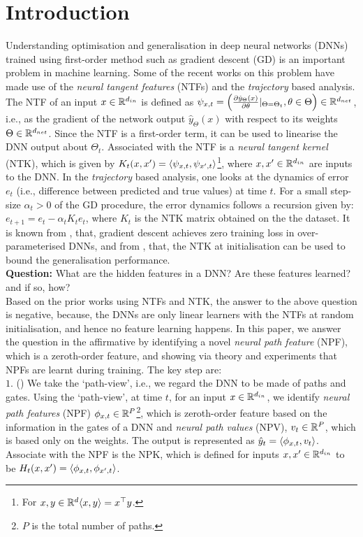 \section{Introduction}
Understanding optimisation and generalisation in deep neural networks (DNNs) trained using first-order method such as gradient descent (GD) is an important problem in machine learning. Some of the recent works on this problem have made use of the \emph{neural tangent features} (NTFs) and the \emph{trajectory} based analysis. The NTF of an input $x\in \mathbb{R}^{d_{in}}$ is defined as $\psi_{x,t}=\left(\frac{\partial \hat{y}_{\Theta}(x)}{\partial \theta}|_{\Theta=\Theta_t},\theta \in \Theta\right)\in \mathbb{R}^{d_{net}}$, i.e., as the gradient of the network output $\hat{y}_{\Theta}(x)$ with respect to its weights $\Theta\in\mathbb{R}^{d_{net}}$. Since the NTF is a first-order term, it can be used to linearise the DNN output about $\Theta_t$. Associated with the NTF is a \emph{neural tangent kernel} (NTK), which is given by $K_t(x,x')=\langle \psi_{x,t},\psi_{x',t}\rangle$\footnote{For $x,y\in\mathbb{R}^d \langle x,y\rangle=x^\top y$.}, where $x,x'\in\mathbb{R}^{d_{in}}$ are inputs to the DNN. In the \emph{trajectory} based analysis, one looks at the dynamics of error $e_t$  (i.e., difference between predicted and true values) at time $t$. For a small step-size $\alpha_t>0$ of the GD procedure, the error dynamics follows a recursion given by: $e_{t+1}=e_t-\alpha_tK_te_t$, where $K_t$ is the NTK matrix obtained on the the dataset. It is known from \cite{dudnn}, that, gradient descent achieves zero training loss in over-parameterised DNNs, and from \cite{cao2019generalization}, that, the NTK at initialisation can be used to bound the generalisation performance.\\
\textbf{Question:} What are the hidden features in a DNN? Are these features learned? and if so, how?\\
Based on the prior works using NTFs and NTK, the answer to the above question is negative, because, the DNNs are only linear learners with the NTFs at random initialisation, and hence no feature learning happens. In this paper, we answer the question in the affirmative by identifying a novel \emph{neural path feature} (NPF), which is a zeroth-order feature, and showing via theory and experiments that NPFs are learnt during training. The key step are:\\
$1.$  () We take the `path-view', i.e., we regard the DNN to be made of paths and gates. Using the `path-view', at time $t$, for an input $x\in \mathbb{R}^{d_{in}}$, we identify \emph{neural path features} (NPF) $\phi_{x,t}\in \mathbb{R}^P$\footnote{$P$ is the total number of paths.}, which is zeroth-order feature based on the information in the gates of a DNN and \emph{neural path values} (NPV), $v_t\in\mathbb{R}^P$, which is based only on the weights. The output is represented as $\hat{y}_t=\langle \phi_{x,t},v_t\rangle$. Associate with the NPF is the NPK, which is defined for inputs $x,x'\in\mathbb{R}^{d_{in}}$ to be $H_t(x,x')=\langle \phi_{x,t},\phi_{x',t}\rangle$.\\

